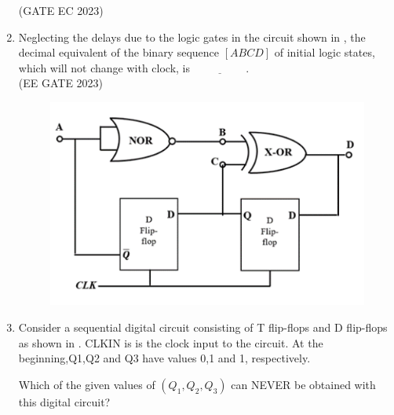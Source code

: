 \begin{enumerate}[label=\arabic*.,ref=\theenumi]
\begin{figure}[H]
{
	}
    \caption{}
	\label{fig:GATE EC 2023}
\end{figure}
\hfill(GATE EC 2023)
%
\item Neglecting the delays due to the logic gates in the circuit shown in 
,
 the 
decimal equivalent of the binary sequence $[ABCD]$ of initial logic states, which will not change with clock, is $\underline{\hspace{2cm}}$.\\

\hfill{(EE GATE 2023)}\\

\begin{figure}[H]
 \centering
\includegraphics[width=0.75\columnwidth]{ide/7474/figs/Gate_question.png}
\caption{}
\label{fig:Gate_question.png}
\end{figure}

\item 
Consider a sequential digital circuit consisting of T flip-flops and D flip-flops as shown in 
.
 CLKIN is is the clock input to the circuit. At the beginning,Q1,Q2 and Q3 have values 0,1 and 1, respectively.
%
	\begin{figure}[H]
    \centering
    \resizebox{0.75\columnwidth}{!}{%

		}
\caption{}
\label{fig:Flip-Flop}
\end{figure}
Which of the given values of \((Q_1, Q_2, Q_3)\) can NEVER be obtained with this digital circuit?
\begin{enumerate}
    

\end{enumerate}
\end{enumerate}
